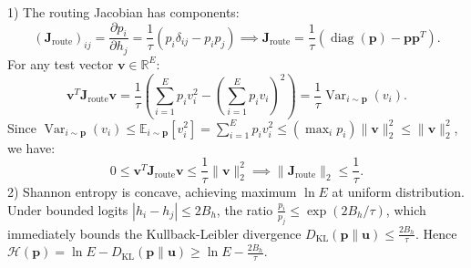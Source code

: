 \documentclass[journal]{IEEEtran}
\begin{document}
\begin{IEEEproof}
1) The routing Jacobian has components:
\begin{equation}
(\mathbf{J}_{\text{route}})_{ij} = \frac{\partial p_i}{\partial h_j} = \frac{1}{\tau} \left( p_i \delta_{ij} - p_i p_j \right) \implies \mathbf{J}_{\text{route}} = \frac{1}{\tau} \left( \operatorname{diag}(\mathbf{p}) - \mathbf{p} \mathbf{p}^T \right).
\end{equation}
For any test vector $\mathbf{v} \in \mathbb{R}^E$:
\begin{equation}
\mathbf{v}^T \mathbf{J}_{\text{route}} \mathbf{v} = \frac{1}{\tau} \left( \sum_{i=1}^E p_i v_i^2 - \left( \sum_{i=1}^E p_i v_i \right)^2 \right) = \frac{1}{\tau} \operatorname{Var}_{i \sim \mathbf{p}}(v_i).
\end{equation}
Since $\operatorname{Var}_{i \sim \mathbf{p}}(v_i) \le \mathbb{E}_{i \sim \mathbf{p}}[v_i^2] = \sum_{i=1}^E p_i v_i^2 \le (\max_i p_i) \|\mathbf{v}\|_2^2 \le \|\mathbf{v}\|_2^2$, we have:
\begin{equation}
0 \le \mathbf{v}^T \mathbf{J}_{\text{route}} \mathbf{v} \le \frac{1}{\tau} \|\mathbf{v}\|_2^2 \implies \|\mathbf{J}_{\text{route}}\|_2 \le \frac{1}{\tau}.
\end{equation}
2) Shannon entropy is concave, achieving maximum $\ln E$ at uniform distribution. Under bounded logits $|h_i - h_j| \le 2 B_h$, the ratio $\frac{p_i}{p_j} \le \exp(2 B_h / \tau)$, which immediately bounds the Kullback-Leibler divergence $D_{\text{KL}}(\mathbf{p} \parallel \mathbf{u}) \le \frac{2 B_h}{\tau}$. Hence $\mathcal{H}(\mathbf{p}) = \ln E - D_{\text{KL}}(\mathbf{p} \parallel \mathbf{u}) \ge \ln E - \frac{2 B_h}{\tau}$.
\end{IEEEproof}
\end{document}
